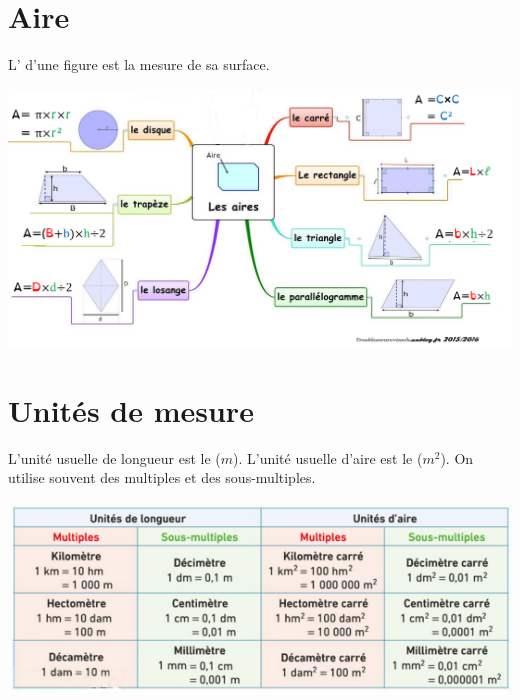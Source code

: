 \documentclass[12pt,a4paper]{article}
\begin{document}
\section{Aire}

\begin{mydef}
	L' d'une figure est la mesure de sa surface.
\end{mydef}


\begin{center}
	\includegraphics[scale=0.5]{cm_aires}
\end{center}

\section{Unités de mesure}

\begin{mydef}
	L'unité usuelle de longueur est le  ($m$). L'unité usuelle d'aire est le  ($m^2$). On utilise souvent des multiples et des sous-multiples.	
\end{mydef}


\begin{center}
	\includegraphics[scale=1]{unites}
\end{center}
\end{document}
